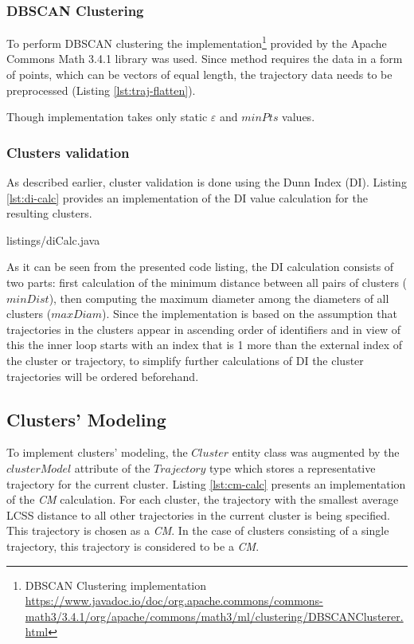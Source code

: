 \subsubsection{DBSCAN Clustering}

To perform DBSCAN clustering the implementation\footnote{DBSCAN Clustering implementation \url{https://www.javadoc.io/doc/org.apache.commons/commons-math3/3.4.1/org/apache/commons/math3/ml/clustering/DBSCANClusterer.html}} provided by the Apache Commons Math 3.4.1 library was used. Since method requires the data in a form of points, which can be vectors of equal length, the trajectory data needs to be preprocessed (Listing \ref{lst:traj-flatten}).



Though implementation takes only static $\varepsilon$ and $minPts$ values.

\subsubsection{Clusters validation}

As described earlier, cluster validation is done using the Dunn Index (DI). Listing \ref{lst:di-calc} provides an implementation of the DI value calculation for the resulting clusters.

 {listings/diCalc.java}

As it can be seen from the presented code listing, the DI calculation consists of two parts: first calculation of the minimum distance between all pairs of clusters ($minDist$), then computing the maximum diameter among the diameters of all clusters ($maxDiam$). Since the implementation is based on the assumption that trajectories in the clusters appear in ascending order of identifiers and in view of this the inner loop starts with an index that is 1 more than the external index of the cluster or trajectory, to simplify further calculations of DI the cluster trajectories will be ordered beforehand.

\subsection{Clusters' Modeling}

To implement clusters' modeling, the $Cluster$ entity class was augmented by the $clusterModel$ attribute of the $Trajectory$ type which stores a representative trajectory for the current cluster. Listing \ref{lst:cm-calc} presents an implementation of the \textit{CM} calculation. For each cluster, the trajectory with the smallest average LCSS distance to all other trajectories in the current cluster is being specified. This trajectory is chosen as a \textit{CM}. In the case of clusters consisting of a single trajectory, this trajectory is considered to be a \textit{CM}.

